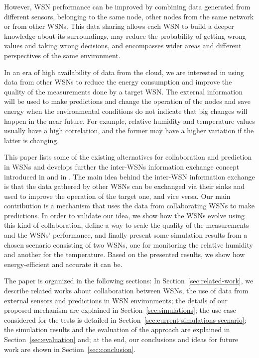 \documentclass{llncs}
\begin{document}
However, WSN performance can be improved by combining data generated from 
different sensors, belonging to the same node, other nodes from the same network 
or from other WSNs. This data sharing allows each WSN to build a deeper 
knowledge about its surroundings, may reduce the probability of getting wrong 
values and taking wrong decisions, and encompasses wider areas and different 
perspectives of the same environment. 




In an era of high availability of data from the cloud, we are interested in 
using data from other WSNs to reduce the energy consumption and improve the 
quality of the measurements done by a target WSN. The external information will 
be used to make predictions and change the operation of the nodes and save 
energy when the environmental conditions do not indicate that big changes will 
happen in the near future. For example, relative humidity and temperature values 
usually have a high correlation, and the former may have a higher variation if 
the latter is changing.

This paper lists some of the existing alternatives for collaboration and 
prediction in WSNs and develops further the inter-WSNs information exchange 
concept introduced in \cite{Pal2012} and in \cite{6583430}. The main idea behind 
the inter-WSN information exchange is that the data gathered by other WSNs can 
be exchanged via their sinks and used to improve the operation of the target 
one, and vice versa. 
Our main contribution is a mechanism that uses the data from collaborating WSNs 
to make predictions.
In order to validate our idea, we show how the WSNs evolve using this kind of 
collaboration, define a way to scale the quality of the measurements and the 
WSNs' performance, and finally present some simulation results from a chosen 
scenario consisting of two WSNs, one for monitoring the relative humidity and 
another for the temperature. Based on the presented results, we show how 
energy-efficient and accurate it can be.

The paper is organized in the following sections: In 
Section~\ref{sec:related-work}, we describe related works about collaboration 
between WSNs, the use of data from external sensors and predictions in WSN 
environments; the details of our proposed mechanism are explained in 
Section~\ref{sec:simulations}; the use case considered for the tests is 
detailed in Section~\ref{sec:current-simulations-scenario}; the simulation 
results and the evaluation of the approach are explained in 
Section~\ref{sec:evaluation} and; at the end, our conclusions and ideas for 
future work are shown in Section~\ref{sec:conclusion}.
\end{document}
